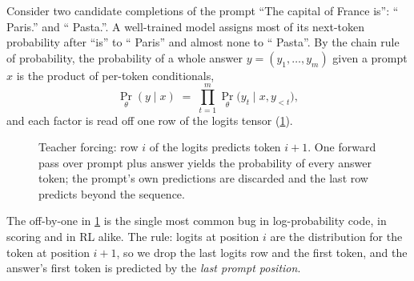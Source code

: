 Consider two candidate completions of the prompt ``The capital of France is'': `` Paris.'' and
`` Pasta.''. A well-trained model assigns most of its next-token probability after ``is'' to
`` Paris'' and almost none to `` Pasta''. By the chain rule of probability, the probability of a
whole answer $y = (y_1, \dots, y_m)$ given a prompt $x$ is the product of per-token conditionals,
\begin{equation}
  \Pr_\theta(y \mid x) \;=\; \prod_{t=1}^{m} \Pr_\theta\bigl(y_t \mid x, y_{<t}\bigr),
  \label{eq:refine:chain}
\end{equation}
and each factor is read off one row of the logits tensor (\cref{fig:refine:shift}).

\begin{figure}[t]
\centering
{}
\caption{Teacher forcing: row $i$ of the logits predicts token $i{+}1$. One forward pass over prompt
plus answer yields the probability of every answer token; the prompt's own predictions are discarded
and the last row predicts beyond the sequence.}
\label{fig:refine:shift}
\end{figure}

The off-by-one in \cref{fig:refine:shift} is the single most common bug in log-probability code, in
scoring and in RL alike. The rule: logits at position $i$ are the distribution for the token at
position $i+1$, so we drop the last logits row and the first token, and the answer's first token is
predicted by the \emph{last prompt position}.

